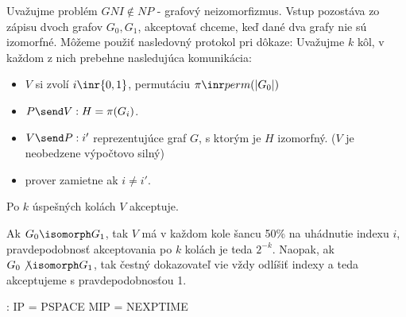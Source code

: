 \begin{priklad}
    Uvažujme problém $GNI \not \in NP$ - grafový neizomorfizmus.
    Vstup pozostáva zo zápisu dvoch grafov $G_0, G_1$, akceptovať chceme, keď
    dané dva grafy nie sú izomorfné. Môžeme použiť nasledovný protokol
    pri dôkaze: Uvažujme $k$ kôl, v každom z nich prebehne nasledujúca
    komunikácia:
    \begin{itemize}
        \item $V$ si zvolí $i \inr \{0,1\}$, permutáciu
         $\pi \inr perm(|G_0|)$
        \item $P \send V: H = \pi(G_i)$.
        \item $V \send P: i'$ reprezentujúce graf $G$, s ktorým je $H$
        izomorfný. ($V$ je neobedzene výpočtovo silný)
        \item prover zamietne ak $i \not = i'$.
    \end{itemize}
    Po $k$ úspešných kolách $V$ akceptuje.

    Ak $G_0 \isomorph G_1$, tak $V$ má v každom kole šancu 50\% na
    uhádnutie indexu $i$, pravdepodobnosť akceptovania po $k$ kolách je teda
    $2^{-k}$.
    Naopak, ak $G_0 \not \isomorph G_1$, tak čestný dokazovateľ vie
    vždy odlíšiť indexy a teda akceptujeme s pravdepodobnosťou 1.
\end{priklad}

:
IP = PSPACE
MIP = NEXPTIME

